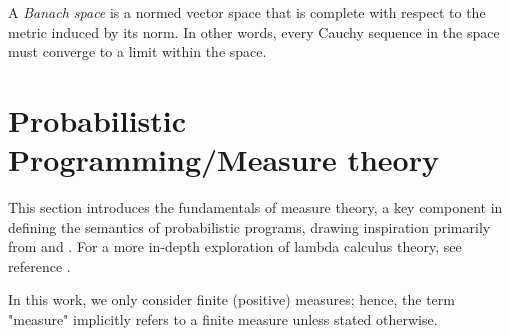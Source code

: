 \begin{definition}
  A \emph{Banach space} is a normed vector space that is complete with respect to the metric induced by its norm. In other words, every Cauchy sequence in the space must converge to a limit within the space.
\end{definition}








\section{Probabilistic Programming/Measure theory} \label{sec:pp}

 This section introduces the fundamentals of measure theory, a key component in defining the semantics of probabilistic programs, drawing inspiration primarily from \cite{dahlqvistSemanticsProbabilisticProgramming2020a} and \cite{athreyaMeasureTheoryProbability2006}. For a more in-depth exploration of lambda calculus theory, see reference \cite{aliprantisBanachLattices1999}. 


In this work, we only consider finite (positive) measures; hence, the term "measure" implicitly refers to a finite measure unless stated otherwise.




